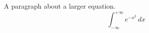 \documentclass{article}
\begin{document}
	A paragraph about a larger equation.
	\[
	\int_{-\infty}^{+\infty} e^{-x^{2}} \, dx
	\]
\end{document}
